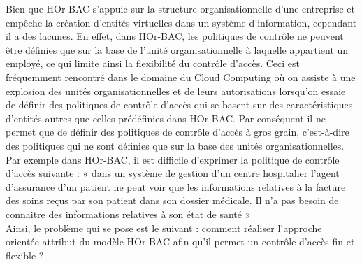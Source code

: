 
 Bien que HOr-BAC s'appuie sur la structure organisationnelle d'une entreprise et empêche la création d'entités virtuelles dans un système d'information, cependant il a des lacunes. En effet, dans HOr-BAC, les politiques de contrôle ne peuvent être définies que sur la base de l'unité organisationnelle à laquelle appartient un employé, ce qui limite ainsi la flexibilité du contrôle d'accès. Ceci est  fréquemment rencontré  dans le domaine du Cloud Computing où on assiste à une explosion des unités organisationnelles et de leurs autorisations lorsqu'on essaie de définir des politiques de contrôle d'accès qui se basent sur des caractéristiques d'entités autres que celles prédéfinies dans HOr-BAC. Par conséquent il ne permet que de définir des politiques de contrôle d'accès à gros grain, c'est-à-dire des politiques qui ne sont définies que sur la base des unités organisationnelles. Par exemple dans HOr-BAC, il est difficile d'exprimer la politique de contrôle d'accès suivante : « dans un système de gestion d'un centre hospitalier l'agent d'assurance d'un patient ne peut voir que les informations relatives à la facture des soins reçus par son patient dans son dossier médicale. Il  n'a pas besoin de connaitre des informations relatives à son état de santé » \\
\hspace*{0.5cm} Ainsi, le problème qui se pose est le suivant : comment réaliser l'approche orientée attribut du modèle HOr-BAC afin qu'il permet un contrôle d'accès fin et flexible ?



